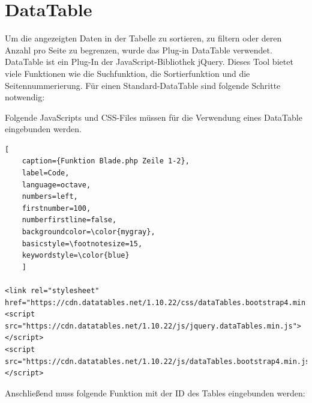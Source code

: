 \newpage
\section{DataTable} \label{sec:DataTable}
Um die angezeigten Daten in der Tabelle zu sortieren, zu filtern oder deren Anzahl pro Seite zu begrenzen, wurde das Plug-in DataTable verwendet. DataTable ist ein Plug-In der JavaScript-Bibliothek jQuery. Dieses Tool bietet viele Funktionen wie die Suchfunktion, die Sortierfunktion und die Seitennummerierung.
Für einen Standard-DataTable sind folgende Schritte notwendig:

Folgende JavaScripts und CSS-Files müssen für die Verwendung eines DataTable eingebunden werden.


\renewcommand{\lstlistingname}{Quellcode}

\begin{lstlisting}[
	caption={Funktion Blade.php Zeile 1-2},
	label=Code,
	language=octave,
	numbers=left,
	firstnumber=100,
	numberfirstline=false,
	backgroundcolor=\color{mygray},
	basicstyle=\footnotesize=15,
	keywordstyle=\color{blue}
	]
	
<link rel="stylesheet" href="https://cdn.datatables.net/1.10.22/css/dataTables.bootstrap4.min.css>
<script src="https://cdn.datatables.net/1.10.22/js/jquery.dataTables.min.js"></script>
<script src="https://cdn.datatables.net/1.10.22/js/dataTables.bootstrap4.min.js"></script>

\end{lstlisting}
Anschließend muss folgende Funktion mit der ID des Tables eingebunden werden:

